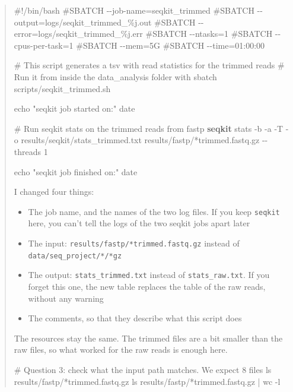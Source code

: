 \documentclass[
  letterpaper,
  DIV=11,
  numbers=noendperiod]{scrreprt}
\newenvironment{Shaded}{}{}
\newcommand{\AttributeTok}[1]{\textcolor[rgb]{0.84,0.23,0.29}{#1}}
\newcommand{\BuiltInTok}[1]{\textcolor[rgb]{0.84,0.23,0.29}{#1}}
\newcommand{\CommentTok}[1]{\textcolor[rgb]{0.42,0.45,0.49}{#1}}
\newcommand{\ExtensionTok}[1]{\textcolor[rgb]{0.84,0.23,0.29}{\textbf{#1}}}
\newcommand{\FunctionTok}[1]{\textcolor[rgb]{0.44,0.26,0.76}{#1}}
\newcommand{\KeywordTok}[1]{\textcolor[rgb]{0.84,0.23,0.29}{#1}}
\newcommand{\NormalTok}[1]{\textcolor[rgb]{0.14,0.16,0.18}{#1}}
\newcommand{\PreprocessorTok}[1]{\textcolor[rgb]{0.84,0.23,0.29}{#1}}
\newcommand{\StringTok}[1]{\textcolor[rgb]{0.01,0.18,0.38}{#1}}
\providecommand{\tightlist}{%
  \setlength{\itemsep}{0pt}\setlength{\parskip}{0pt}}
\begin{document}
\begin{tcolorbox}
\begin{quote}
\begin{Shaded}
\begin{Highlighting}[]
\CommentTok{\#!/bin/bash}
\CommentTok{\#SBATCH {-}{-}job{-}name=seqkit\_trimmed}
\CommentTok{\#SBATCH {-}{-}output=logs/seqkit\_trimmed\_\%j.out}
\CommentTok{\#SBATCH {-}{-}error=logs/seqkit\_trimmed\_\%j.err}
\CommentTok{\#SBATCH {-}{-}ntasks=1}
\CommentTok{\#SBATCH {-}{-}cpus{-}per{-}task=1}
\CommentTok{\#SBATCH {-}{-}mem=5G}
\CommentTok{\#SBATCH {-}{-}time=01:00:00}

\CommentTok{\# This script generates a tsv with read statistics for the trimmed reads}
\CommentTok{\# Run it from inside the data\_analysis folder with \textasciigrave{}sbatch scripts/seqkit\_trimmed.sh\textasciigrave{}}

\BuiltInTok{echo} \StringTok{"seqkit job started on:"}
\FunctionTok{date}

\CommentTok{\# Run seqkit stats on the trimmed reads from fastp}
\ExtensionTok{seqkit}\NormalTok{ stats }\AttributeTok{{-}b} \AttributeTok{{-}a} \AttributeTok{{-}T} \AttributeTok{{-}o}\NormalTok{ results/seqkit/stats\_trimmed.txt results/fastp/}\PreprocessorTok{*}\NormalTok{trimmed.fastq.gz }\AttributeTok{{-}{-}threads}\NormalTok{ 1}

\BuiltInTok{echo} \StringTok{"seqkit job finished on:"}
\FunctionTok{date}
\end{Highlighting}
\end{Shaded}

I changed four things:

\begin{itemize}
\tightlist
\item
  The job name, and the names of the two log files. If you keep
  \texttt{seqkit} here, you can't tell the logs of the two seqkit jobs
  apart later
\item
  The input: \texttt{results/fastp/*trimmed.fastq.gz} instead of
  \texttt{data/seq\_project/*/*gz}
\item
  The output: \texttt{stats\_trimmed.txt} instead of
  \texttt{stats\_raw.txt}. If you forget this one, the new table
  replaces the table of the raw reads, without any warning
\item
  The comments, so that they describe what this script does
\end{itemize}

The resources stay the same. The trimmed files are a bit smaller than
the raw files, so what worked for the raw reads is enough here.

\begin{Shaded}
\begin{Highlighting}[]
\CommentTok{\# Question 3: check what the input path matches. We expect 8 files}
\FunctionTok{ls}\NormalTok{ results/fastp/}\PreprocessorTok{*}\NormalTok{trimmed.fastq.gz}
\FunctionTok{ls}\NormalTok{ results/fastp/}\PreprocessorTok{*}\NormalTok{trimmed.fastq.gz }\KeywordTok{|} \FunctionTok{wc} \AttributeTok{{-}l}


\end{Highlighting}
\end{Shaded}
\end{quote}
\end{tcolorbox}
\end{document}
